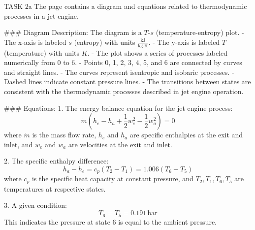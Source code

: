 TASK 2a  
The page contains a diagram and equations related to thermodynamic processes in a jet engine.

### Diagram Description:
The diagram is a \( T \)-\( s \) (temperature-entropy) plot.  
- The x-axis is labeled \( s \) (entropy) with units \( \frac{\text{kJ}}{\text{kg·K}} \).  
- The y-axis is labeled \( T \) (temperature) with units \( K \).  
- The plot shows a series of processes labeled numerically from 0 to 6.  
  - Points 0, 1, 2, 3, 4, 5, and 6 are connected by curves and straight lines.  
  - The curves represent isentropic and isobaric processes.  
  - Dashed lines indicate constant pressure lines.  
  - The transitions between states are consistent with the thermodynamic processes described in jet engine operation.  

### Equations:
1. The energy balance equation for the jet engine process:  
   \[
   \dot{m} \left( h_e - h_a + \frac{1}{2} w_e^2 - \frac{1}{2} w_a^2 \right) = 0
   \]  
   where \( \dot{m} \) is the mass flow rate, \( h_e \) and \( h_a \) are specific enthalpies at the exit and inlet, and \( w_e \) and \( w_a \) are velocities at the exit and inlet.

2. The specific enthalpy difference:  
   \[
   h_a - h_e = c_p (T_2 - T_1) = 1.006 (T_6 - T_5)
   \]  
   where \( c_p \) is the specific heat capacity at constant pressure, and \( T_2, T_1, T_6, T_5 \) are temperatures at respective states.

3. A given condition:  
   \[
   T_6 = T_5 = 0.191 \, \text{bar}
   \]  
   This indicates the pressure at state 6 is equal to the ambient pressure.